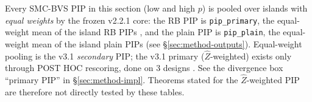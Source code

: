 \begin{divergence}
Every SMC-BVS PIP in this section (low and high $p$) is pooled over islands with \emph{equal weights} by the frozen v2.2.1 core:
the RB PIP is \texttt{pip\_primary}, the equal-weight mean of the island RB PIPs
, and the plain PIP is \texttt{pip\_plain},
the equal-weight mean of the island plain PIPs 
(see \S\ref{sec:method-outputs}). Equal-weight pooling is the v3.1 \emph{secondary} PIP; the v3.1 primary ($\hat Z$-weighted) exists only through POST HOC rescoring,
done on 3 designs . See the divergence box ``primary PIP'' in
\S\ref{sec:method-impl}. Theorems stated for the $\hat Z$-weighted PIP are therefore not directly tested by these tables.
\end{divergence}

